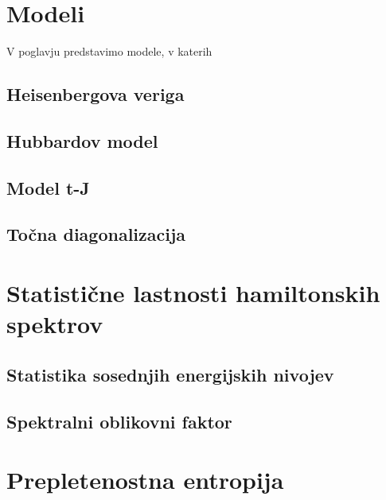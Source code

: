 \documentclass[10pt,a4paper]{article}
\begin{document}
\newpage
\section{Modeli}
V poglavju predstavimo modele, v katerih 
\subsection{Heisenbergova veriga}
\subsection{Hubbardov model}
\subsection{Model t-J}
\subsection{Točna diagonalizacija}
\section{Statistične lastnosti hamiltonskih spektrov}
\subsection{Statistika sosednjih energijskih nivojev}
\subsection{Spektralni oblikovni faktor}	
\section{Prepletenostna entropija}



\newpage


\end{document}
